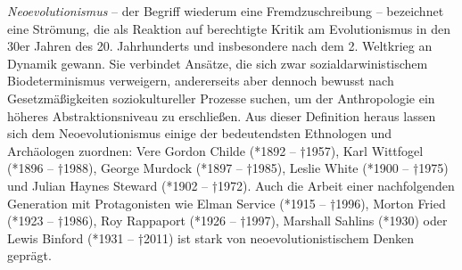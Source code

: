 \documentclass[openany,twoside,twocolumn]{book}
\begin{document}
\emph{Neoevolutionismus} -- der Begriff wiederum eine Fremdzuschreibung -- bezeichnet eine Strömung, die als Reaktion auf berechtigte Kritik am Evolutionismus in den 30er Jahren des 20. Jahrhunderts und insbesondere nach dem 2. Weltkrieg an Dynamik gewann. Sie verbindet Ansätze, die sich zwar sozialdarwinistischem Biodeterminismus verweigern, andererseits aber dennoch bewusst nach Gesetzmäßigkeiten soziokultureller Prozesse suchen, um der Anthropologie ein höheres Abstraktionsniveau zu erschließen. Aus dieser Definition heraus lassen sich dem Neoevolutionismus einige der bedeutendsten Ethnologen und Archäologen zuordnen: Vere Gordon Childe (*1892 -- †1957), Karl Wittfogel (*1896 -- †1988), George Murdock (*1897 -- †1985), Leslie White (*1900 -- †1975) und Julian Haynes Steward (*1902 -- †1972). Auch die Arbeit einer nachfolgenden Generation mit Protagonisten wie Elman Service (*1915 -- †1996), Morton Fried (*1923 -- †1986), Roy Rappaport (*1926 -- †1997), Marshall Sahlins (*1930) oder Lewis Binford (*1931 -- †2011) ist stark von neoevolutionistischem Denken geprägt.
\end{document}

